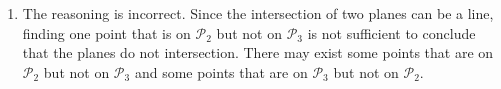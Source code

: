 \begin{exercises}
\begin{problist}
\begin{solution}
\begin{enumerate}
				\item The reasoning is incorrect. Since the intersection of two planes can be a line,
				finding one point that is on $\mathcal{P}_{2}$ but not on $\mathcal{P}_{3}$ is
				not sufficient to conclude that the planes do not intersection. There may exist some
				points that are on $\mathcal{P}_{2}$ but not on $\mathcal{P}_{3}$ and some points
				that are on $\mathcal{P}_{3}$ but not on $\mathcal{P}_{2}$.
			\end{enumerate}
		\end{solution}
	\end{problist}
\end{exercises}
